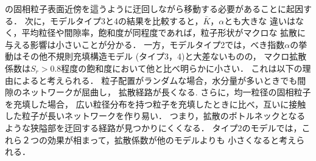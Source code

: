 の固相粒子表面近傍を這うように迂回しながら移動する必要があることに起因する．
%
次に，モデルタイプ3と4の結果を比較すると，$\bar{K}，\alpha$とも大きな
違いはなく，平均粒径や間隙率，飽和度が同程度であれば，粒子形状がマクロな
拡散に与える影響は小さいことが分かる．
一方，モデルタイプ2では，べき指数$\alpha$の挙動はその他不規則充填構造モデル
(タイプ3，4)と大差ないものの，
マクロ拡散係数は$S_r>0.8$程度の飽和度において他と比べ明らかに小さい．
これは以下の理由によると考えられる．
%
粒子配置がランダムな場合，水分量が多いときでも間隙のネットワークが屈曲し，
拡散経路が長くなる. さらに，均一粒径の固相粒子を充填した場合，
広い粒径分布を持つ粒子を充填したときに比べ，互いに接触した粒子が長いネットワークを作り易い．
つまり，拡散のボトルネックとなるような狭隘部を迂回する経路が見つかりにくくなる．
タイプ2のモデルでは，これら２つの効果が相まって，拡散係数が他のモデルよりも
小さくなると考えられる．
%
